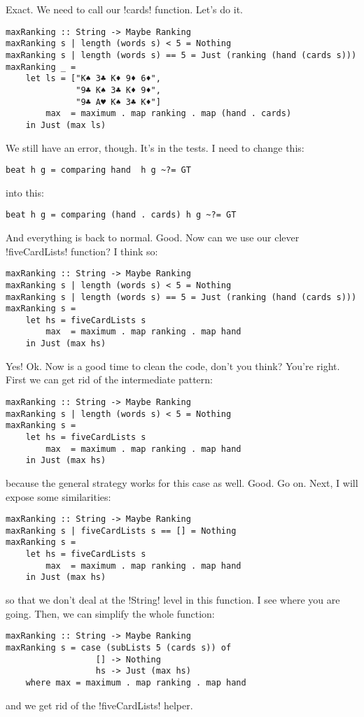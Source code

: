 \lhN Exact. We need to call our \il!cards! function.
\lhA \error Let's do it.
\begin{lstlisting}[frame=single]
maxRanking :: String -> Maybe Ranking
maxRanking s | length (words s) < 5 = Nothing
maxRanking s | length (words s) == 5 = Just (ranking (hand (cards s)))
maxRanking _ = 
    let ls = ["K♠ 3♣ K♦ 9♦ 6♦", 
              "9♣ K♠ 3♣ K♦ 9♦", 
              "9♣ A♥ K♠ 3♣ K♦"]
        max  = maximum . map ranking . map (hand . cards) 
    in Just (max ls)
\end{lstlisting}
\error We still have an error, though.
\lhN It's in the tests. I need to change this:
\begin{lstlisting}[frame=single]
beat h g = comparing hand  h g ~?= GT
\end{lstlisting}
into this:
\begin{lstlisting}[frame=single]
beat h g = comparing (hand . cards) h g ~?= GT
\end{lstlisting}
\success And everything is back to normal.
\lhA Good.
\lhN Now can we use our clever \il!fiveCardLists! function?
\lhA I think so:
\begin{lstlisting}[frame=single]
maxRanking :: String -> Maybe Ranking
maxRanking s | length (words s) < 5 = Nothing
maxRanking s | length (words s) == 5 = Just (ranking (hand (cards s)))
maxRanking s = 
    let hs = fiveCardLists s
        max  = maximum . map ranking . map hand 
    in Just (max hs)
\end{lstlisting}
\success Yes!
\lhN Ok. Now is a good time to clean the code, don't you think?
\lhA You're right. First we can get rid of the intermediate pattern:
\begin{lstlisting}[frame=single]
maxRanking :: String -> Maybe Ranking
maxRanking s | length (words s) < 5 = Nothing
maxRanking s = 
    let hs = fiveCardLists s
        max  = maximum . map ranking . map hand 
    in Just (max hs)
\end{lstlisting}
\success because the general strategy works for this case as well.
\lhN Good. Go on.
\lhA Next, I will expose some similarities:
\begin{lstlisting}[frame=single]
maxRanking :: String -> Maybe Ranking
maxRanking s | fiveCardLists s == [] = Nothing
maxRanking s = 
    let hs = fiveCardLists s
        max  = maximum . map ranking . map hand 
    in Just (max hs)
\end{lstlisting}
\success so that we don't deal at the \il!String! level in this function.
\lhN I see where you are going. 
\lhA Then, we can simplify the whole function:
\begin{lstlisting}[frame=single]
maxRanking :: String -> Maybe Ranking
maxRanking s = case (subLists 5 (cards s)) of
                  [] -> Nothing
                  hs -> Just (max hs)
    where max = maximum . map ranking . map hand
\end{lstlisting}
\success and we get rid of the \il!fiveCardLists! helper. 

